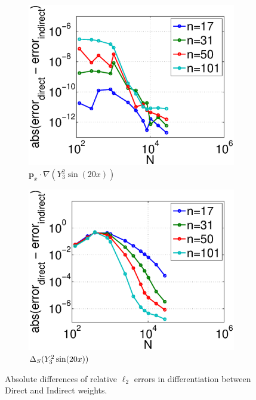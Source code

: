 \begin{figure}
	\centering
		\begin{subfigure}[t]{0.48\textwidth}
		\centering
	\includegraphics[width=1.0\textwidth]{../figures/appendices/direct_vs_indirect_weights/compare_weight_generation/xsfc_vs_xsfc_alt_on_sph32_times_sine_20x/abs_diff_of_rel_l2_errors.eps}
	\caption{$\mathbf{p}_{x} \cdot \nabla ( Y_{3}^{2} \sin(20 x))$}
	\end{subfigure}
	\begin{subfigure}[t]{0.48\textwidth}
	\centering
	\includegraphics[width=1.0\textwidth]{../figures/appendices/direct_vs_indirect_weights/compare_weight_generation/lsfc_vs_px_grad_dot_px_grad/abs_diff_of_rel_l2_errors.eps}
	\caption{$\Delta_S ( Y_{3}^{2} \sin(20 x) )$}
	\end{subfigure}
		\caption{Absolute differences of relative $\ell_{2}$ errors in differentiation between Direct and Indirect weights.}
\end{figure}

